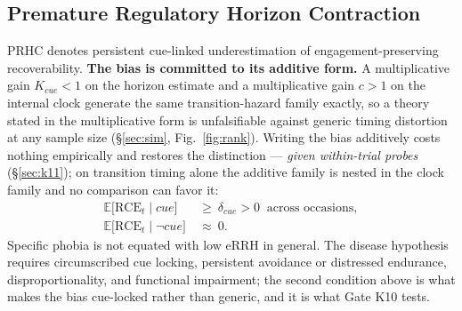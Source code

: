 \documentclass[9pt,twocolumn]{article}
\newcommand{\RCE}{\mathrm{RCE}}
\begin{document}
\subsection{Premature Regulatory Horizon Contraction}
\label{sec:prhc}
PRHC denotes persistent cue-linked underestimation of engagement-preserving recoverability. \textbf{The bias is committed to its additive form.} A multiplicative gain $K_{cue}<1$ on the horizon estimate and a multiplicative gain $c>1$ on the internal clock generate the same transition-hazard family exactly, so a theory stated in the multiplicative form is unfalsifiable against generic timing distortion at any sample size (\S\ref{sec:sim}, Fig.~\ref{fig:rank}). Writing the bias additively costs nothing empirically and restores the distinction --- \emph{given within-trial probes} (\S\ref{sec:k11}); on transition timing alone the additive family is nested in the clock family and no comparison can favor it:
\begin{align*}
\mathbb{E}\big[\RCE_t\mid cue\big]&\ \ge\ \delta_{cue}>0\ \text{ across occasions},\\[-0.1em]
\mathbb{E}\big[\RCE_t\mid \neg cue\big]&\ \approx\ 0 .
\end{align*}
Specific phobia is not equated with low eRRH in general. The disease hypothesis requires circumscribed cue locking, persistent avoidance or distressed endurance, disproportionality, and functional impairment; the second condition above is what makes the bias cue-locked rather than generic, and it is what Gate K10 tests.
\end{document}

